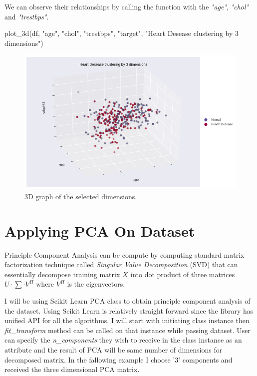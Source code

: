 \documentclass[12pt]{article}
\begin{document}
We can observe their relationships by calling the function with the \textit{"age"}, \textit{"chol"} and \textit{"trestbps"}.

\begin{python}
    plot_3d(df, "age", "chol", "trestbps", "target", "Heart Desease clustering by 3 dimensions")
\end{python}

\begin{figure}[H]
    \centering
    \includegraphics[width=\textwidth]{img/3d-selected.png}
    \caption{3D graph of the selected dimensions.}
    \label{3D:graph}
\end{figure}

\section*{Applying PCA On Dataset}

Principle Component Analysis can be compute by computing standard matrix factorization technique called \textit{Singular Value Decomposition} (SVD) that can essentially decompose training matrix $X$ into dot product of three matrices $U \cdot \sum \cdot V^{H}$ where $V^{H}$ is the eigenvectors. 

I will be using Scikit Learn PCA class to obtain principle component analysis of the dataset. Using Scikit Learn is relatively straight forward since the library has unified API for all the algorithms. I will start with initiating class instance then \textit{fit\_transform} method can be called on that instance while passing dataset. User can specify the \textit{n\_components} they wish to receive in the class instance as an attribute and the result of PCA will be same number of dimensions for decomposed matrix. In the fallowing example I choose '3' components and received the three dimensional PCA matrix.  
\end{document}
